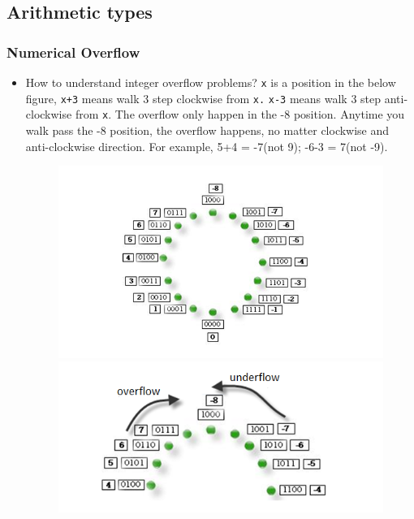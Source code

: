 \documentclass[a4paper,11pt,twoside]{book}
\begin{document}
\subsection{Arithmetic types}
\subsubsection{Numerical Overflow}

\begin{itemize}
	\item How to understand integer overflow problems? \texttt{x} is a position in the below figure, \texttt{x+3} means walk 3 step clockwise from \texttt{x.} \texttt{x-3} means walk 3 step anti-clockwise from \texttt{x}. The overflow only happen in the -8 position. Anytime you walk pass the -8 position, the overflow happens, no matter clockwise and anti-clockwise direction. For example, 5+4 = -7(not 9); -6-3 = 7(not -9).

	
\begin{figure}[!htb]
	\begin{minipage}{0.48\textwidth}
		\centering
		\includegraphics[width=.9\linewidth]{pics/integer.png}
	\end{minipage}\hfill
	\begin{minipage}{0.48\textwidth}
		\centering
		\includegraphics[width=.9\linewidth]{pics/integer1.png}
	\end{minipage}
\end{figure}



\end{itemize}
\end{document}
